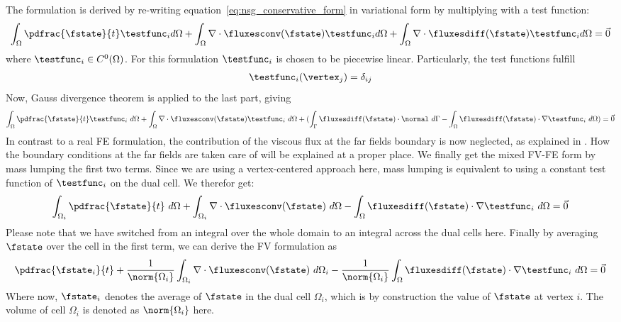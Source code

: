 \documentclass[../main.tex]{subfiles}
\begin{document}
The formulation is derived by re-writing equation~\ref{eq:nsg_conservative_form} in variational form by multiplying with a test function:
\begin{align}
\int_\Omega \pdfrac{\fstate}{t}\testfunc_i d\Omega +
\int_\Omega \nabla\cdot\fluxesconv(\fstate)\testfunc_i d\Omega +
 \int_{\Omega} \nabla\cdot\fluxesdiff(\fstate)\testfunc_i d\Omega = \vec{0}
\end{align}
where $\testfunc_i \in C^0(\Omega)$. For this formulation $\testfunc_i$ is chosen to be piecewise linear. Particularly, the test functions fulfill
\begin{align}
\testfunc_i(\vertex_j)=\delta_{ij}
\end{align}
Now, Gauss divergence theorem is applied to the last part, giving
\begin{align}
\int_\Omega \pdfrac{\fstate}{t}\testfunc_i ~d\Omega +
\int_\Omega \nabla\cdot\fluxesconv(\fstate)\testfunc_i ~d\Omega +
(\int_{\Gamma} \fluxesdiff(\fstate)\cdot\normal ~d\Gamma - \int_\Omega \fluxesdiff(\fstate)\cdot\nabla\testfunc_i ~d\Omega     ) =
\vec{0}
\end{align}
In contrast to a real \ac{FE} formulation, the contribution of the viscous flux at the far fields boundary is now neglected, as explained in \cite{Lakshminarayan2014}. How the boundary conditions at the far fields are taken care of will be explained at a proper place.
We finally get the mixed \ac{FV}-\ac{FE} form by mass lumping the first two terms. Since we are using a vertex-centered approach here, mass lumping is equivalent to using a constant test function of $\testfunc_i$ on the dual cell. We therefor get:
\begin{align}
\int_{\Omega_i} \pdfrac{\fstate}{t} ~d\Omega +
\int_{\Omega_i} \nabla\cdot\fluxesconv(\fstate) ~d\Omega -
\int_\Omega \fluxesdiff(\fstate)\cdot\nabla\testfunc_i ~d\Omega  =
\vec{0}
\end{align}
Please note that we have switched from an integral over the whole domain to an integral across the dual cells here.
Finally by averaging $\fstate$ over the cell in the first term, we can derive the \ac{FV} formulation as
\begin{align}
\pdfrac{\fstate_i}{t} +
\frac{1}{\norm{\Omega_i}} \int_{\Omega_i} \nabla\cdot\fluxesconv(\fstate) ~d\Omega_i -
\frac{1}{\norm{\Omega_i}} \int_\Omega \fluxesdiff(\fstate)\cdot\nabla\testfunc_i ~d\Omega  =
\vec{0}
\end{align}
Where now, $\fstate_i$ denotes the average of $\fstate$ in the dual cell $\Omega_i$, which is by construction the value of $\fstate$ at vertex $i$. The volume of cell $\Omega_i$ is denoted as $\norm{\Omega_i}$ here.
\end{document}
